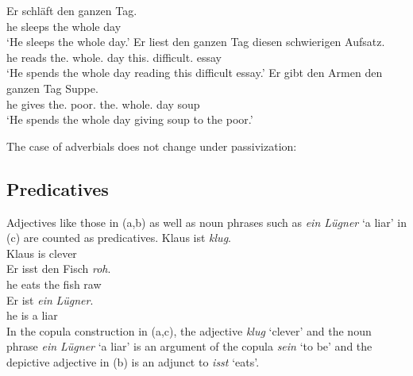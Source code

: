 {\eal
\ex 
\gll Er schläft den ganzen Tag.\\
     he sleeps the whole day\\
\glt `He sleeps the whole day.'
\ex 
\gll Er liest den ganzen Tag diesen schwierigen Aufsatz.\\
	 he reads the.\acc{} whole.\acc{} day this.\acc{} difficult.\acc{} essay\\
\glt `He spends the whole day reading this difficult essay.'
\ex 
\gll Er gibt den Armen den ganzen Tag Suppe.\\
	 he gives the.\dat{} poor.\dat{} the.\acc{} whole.\acc{} day soup\\
\glt `He spends the whole day giving soup to the poor.'
\zl

The case of adverbials does not change under passivization:
\eal
{}
\zl
{}

\subsection{Predicatives}

Adjectives like those in (a,b) as well as noun phrases such as \emph{ein Lügner} `a liar' in (c)
are counted as predicatives. 
\eal
\ex 
\gll Klaus ist \emph{klug}.\\
	 Klaus is clever\\
\ex 
\gll Er isst den Fisch \emph{roh}.\\
	 he eats the fish raw\\
\ex 
\gll Er ist \emph{ein} \emph{Lügner}.\\
     he is a liar\\
\zl
In the copula construction in (a,c), the adjective \emph{klug} `clever' and the noun phrase
\emph{ein Lügner} `a liar' is an argument of the copula \emph{sein} `to be' and the depictive adjective in (b)
is an adjunct to \emph{isst} `eats'.

}
